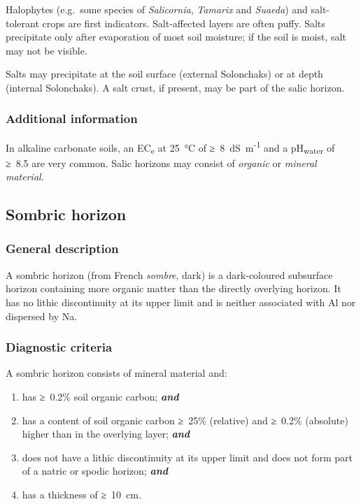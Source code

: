 \documentclass[
  letterpaper,
  DIV=11,
  numbers=noendperiod]{scrreprt}
\providecommand{\tightlist}{%
  \setlength{\itemsep}{0pt}\setlength{\parskip}{0pt}}\usepackage{longtable,booktabs,array}
\begin{document}
Halophytes (e.g.~some species of \emph{Salicornia}, \emph{Tamarix} and
\emph{Suaeda}) and salt-tolerant crops are first indicators.
Salt-affected layers are often puffy. Salts precipitate only after
evaporation of most soil moisture; if the soil is moist, salt may not be
visible.

Salts may precipitate at the soil surface (external Solonchaks) or at
depth (internal Solonchaks). A salt crust, if present, may be part of
the salic horizon.

\hypertarget{additional-information-18}{%
\subsubsection{Additional information}\label{additional-information-18}}

In alkaline carbonate soils, an EC\textsubscript{e} at 25~°C of
≥~8~dS~m\textsuperscript{-1} and a pH\textsubscript{water} of ≥~8.5 are
very common. Salic horizons may consist of \emph{organic} or
\emph{mineral material}.

\hypertarget{sombric-horizon}{%
\subsection{Sombric horizon}\label{sombric-horizon}}

\hypertarget{general-description-33}{%
\subsubsection{General description}\label{general-description-33}}

A sombric horizon (from French \emph{sombre}, dark) is a dark-coloured
subsurface horizon containing more organic matter than the directly
overlying horizon. It has no lithic discontinuity at its upper limit and
is neither associated with Al nor dispersed by Na.

\hypertarget{diagnostic-criteria-33}{%
\subsubsection{Diagnostic criteria}\label{diagnostic-criteria-33}}

A sombric horizon consists of mineral material and:

\begin{enumerate}
\def\labelenumi{\arabic{enumi}.}
\tightlist
\item
  has ≥~0.2\% soil organic carbon; \textbf{\emph{and}}
\item
  has a content of soil organic carbon ≥~25\% (relative) and ≥~0.2\%
  (absolute) higher than in the overlying layer; \textbf{\emph{and}}
\item
  does not have a lithic discontinuity at its upper limit and does not
  form part of a natric or spodic horizon; \textbf{\emph{and}}
\item
  has a thickness of ≥~10~cm.
\end{enumerate}
\end{document}
